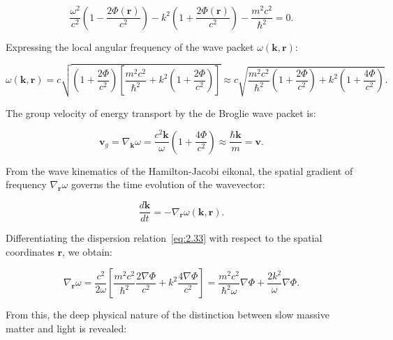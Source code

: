 \begin{equation}\label{eq:2.32}\label{eq:2.82}\tag{2.32}
\frac{\omega^2}{c^2} \left( 1 - \frac{2\Phi(\mathbf{r})}{c^2} \right) - k^2 \left( 1 + \frac{2\Phi(\mathbf{r})}{c^2} \right) - \frac{m^2 c^2}{\hbar^2} = 0.
\end{equation}

Expressing the local angular frequency of the wave packet $\omega(\mathbf{k}, \mathbf{r})$:

\begin{equation}\label{eq:2.33}\label{eq:2.83}\tag{2.33}
\omega(\mathbf{k}, \mathbf{r}) = c \sqrt{ \left( 1 + \frac{2\Phi}{c^2} \right) \left[ \frac{m^2 c^2}{\hbar^2} + k^2 \left( 1 + \frac{2\Phi}{c^2} \right) \right] } \approx c \sqrt{ \frac{m^2 c^2}{\hbar^2}\left(1 + \frac{2\Phi}{c^2}\right) + k^2 \left(1 + \frac{4\Phi}{c^2}\right) }.
\end{equation}

The group velocity of energy transport by the de Broglie wave packet is:

\begin{equation}\label{eq:2.34}\label{eq:2.84}\tag{2.34}
\mathbf{v}_g = \nabla_{\mathbf{k}} \omega = \frac{c^2 \mathbf{k}}{\omega} \left( 1 + \frac{4\Phi}{c^2} \right) \approx \frac{\hbar \mathbf{k}}{m} = \mathbf{v}.
\end{equation}

From the wave kinematics of the Hamilton-Jacobi eikonal, the spatial gradient of frequency $\nabla_\mathbf{r} \omega$ governs the time evolution of the wavevector:

\begin{equation}\label{eq:2.35}\label{eq:2.85}\tag{2.35}
\frac{d\mathbf{k}}{dt} = -\nabla_{\mathbf{r}} \omega(\mathbf{k}, \mathbf{r}).
\end{equation}

Differentiating the dispersion relation~\eqref{eq:2.33} with respect to the spatial coordinates $\mathbf{r}$, we obtain:

\begin{equation}\label{eq:2.36}\label{eq:2.86}\tag{2.36}
\nabla_{\mathbf{r}}\omega = \frac{c^2}{2\omega} \left[ \frac{m^2 c^2}{\hbar^2} \frac{2\nabla\Phi}{c^2} + k^2 \frac{4\nabla\Phi}{c^2} \right] = \frac{m^2 c^2}{\hbar^2 \omega} \nabla\Phi + \frac{2 k^2}{\omega} \nabla\Phi.
\end{equation}

From this, the deep physical nature of the distinction between slow massive matter and light is revealed:

